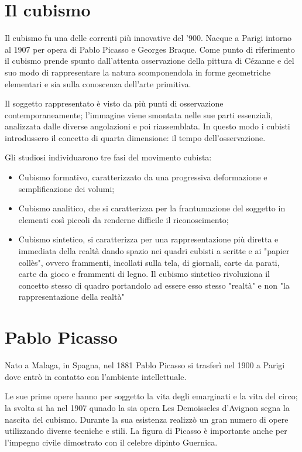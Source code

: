 \section{Il cubismo}
Il cubismo fu una delle correnti più innovative del '900. Nacque a Parigi intorno al 1907 per opera di Pablo Picasso e Georges Braque. Come punto di riferimento il cubismo prende spunto dall'attenta osservazione della pittura di Cézanne e del suo modo di rappresentare la natura scomponendola in forme geometriche elementari e sia sulla conoscenza dell'arte primitiva.

Il soggetto rappresentato è visto da più punti di osservazione contemporaneamente; l'immagine viene smontata nelle sue parti essenziali, analizzata dalle diverse angolazioni e poi riassemblata. In questo modo i cubisti introdussero il concetto di quarta dimensione: il tempo dell'osservazione.

Gli studiosi individuarono tre fasi del movimento cubista:
\begin{itemize}
  \item Cubismo formativo, caratterizzato da una progressiva deformazione e semplificazione dei volumi;
  \item Cubismo analitico, che si caratterizza per la frantumazione del soggetto in elementi così piccoli da renderne difficile il riconoscimento;
  \item Cubismo sintetico, si caratterizza per una rappresentazione più diretta e immediata della realtà dando spazio nei quadri cubisti a scritte e ai "papier collès", ovvero frammenti, incollati sulla tela, di giornali, carte da parati, carte da gioco e frammenti di legno. Il cubismo sintetico rivoluziona il concetto stesso di quadro portandolo ad essere esso stesso "realtà" e non "la rappresentazione della realtà"
\end{itemize}

\section{Pablo Picasso}
Nato a Malaga, in Spagna, nel 1881 Pablo Picasso si trasferì nel 1900 a Parigi dove entrò in contatto con l'ambiente intellettuale.

Le sue prime opere hanno per soggetto la vita degli emarginati e la vita del circo; la svolta si ha nel 1907 qunado la sia opera Les Demoisseles d'Avignon segna la nascita del cubismo. Durante la sua esistenza realizzò un gran numero di opere utilizzando diverse tecniche e stili. La figura di Picasso è importante anche per l'impegno civile dimostrato con il celebre dipinto Guernica.

